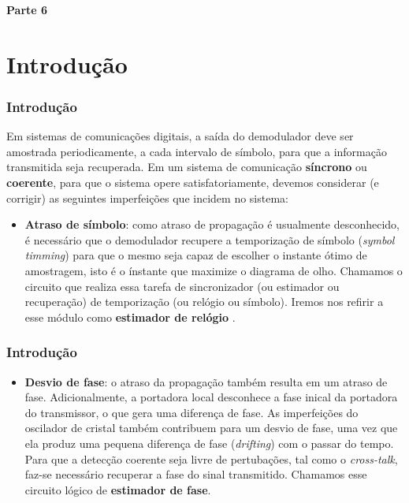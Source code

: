 
\begin{frame}
	\begin{block}{\centering\large\bfseries Parte 6}
		\centering\large\insertpart
	\end{block}
\end{frame}

\section{Introdução}
\begin{frame}[t]
	\frametitle{Introdução}
	
	Em sistemas de comunicações digitais, a saída do demodulador deve ser amostrada periodicamente, a cada intervalo de símbolo, para que a informação transmitida seja recuperada. Em um sistema de comunicação \textbf{síncrono} ou \textbf{coerente}, para que o sistema opere satisfatoriamente, devemos considerar (e corrigir) as seguintes imperfeições que incidem no sistema:
    \begin{itemize}
        \item \textbf{Atraso de símbolo}: como atraso de propagação é usualmente desconhecido, é necessário que o demodulador recupere a temporização de símbolo (\textit{symbol timming}) para que o mesmo seja capaz de escolher o instante ótimo de amostragem, isto é o ínstante que maximize o diagrama de olho. Chamamos o circuito que realiza essa tarefa de sincronizador (ou estimador ou recuperação) de temporização (ou relógio ou símbolo). Iremos nos refirir a esse módulo como \textbf{estimador de relógio} \cite{abrantes2010recuperaccao,mengali2013synchronization}.%
    \end{itemize}
\end{frame}

\begin{frame}[t]
	\frametitle{Introdução}
    \begin{itemize}
        \item \textbf{Desvio de fase}: o atraso da propagação também resulta em um atraso de fase. Adicionalmente, a portadora local desconhece a fase inical da portadora do transmissor, o que gera uma diferença de fase. As imperfeições do oscilador de cristal também contribuem para um desvio de fase, uma vez que ela produz uma pequena diferença de fase (\textit{drifting}) com o passar do tempo. Para que a detecção coerente seja livre de pertubações, tal como o \textit{cross-talk}, faz-se necessário recuperar a fase do sinal transmitido. Chamamos esse circuito lógico de \textbf{estimador de fase}. %
    \end{itemize}
\end{frame}

